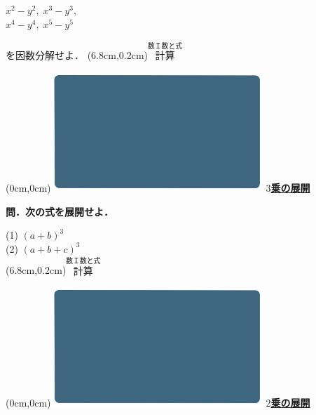 \documentclass[10pt,
fleqn,
dvipdfmx,
uplatex
]{jsarticle}
\begin{document}
\Huge 
\bf\boldmath 
\hspace{0.2zw}$x^2-y^2,\;x^3-y^3,\;$\\
\hspace{0.2zw}$x^4-y^4,\;x^5-y^5$

\Large
\vspace{0.2zw}
\hfill を因数分解せよ．
\at(6.8cm,0.2cm){\small\color{bradorange}$\overset{\text{数Ｉ数と式}}{\text{計算}}$}


\newpage



\at(0cm,0cm){\includegraphics[width=8cm,bb=0 0 1920 1080]{./thumbnails/templates/smart_background/数I数と式.jpeg}}
{\color{orange}\bf\boldmath\huge\underline{$3$乗の展開}}\vspace{0.3zw}

\large 
\bf\boldmath 問．次の式を展開せよ．

\HUGE 
\vspace{-0.3zw}
(1)  $\left(a+b\right)^3$\vspace{-0.1zw}\\
(2)  $\left(a+b+c\right)^3$\\

\at(6.8cm,0.2cm){\small\color{bradorange}$\overset{\text{数Ｉ数と式}}{\text{計算}}$}


\newpage



\at(0cm,0cm){\includegraphics[width=8cm,bb=0 0 1920 1080]{./thumbnails/templates/smart_background/数I数と式.jpeg}}
{\color{orange}\bf\boldmath\huge\underline{$2$乗の展開}}\vspace{0.1zw}
\end{document}
